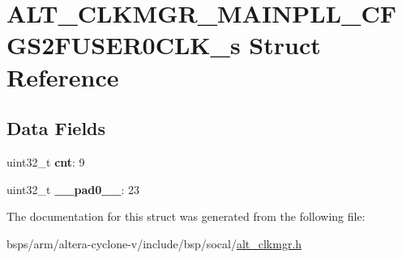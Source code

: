 \hypertarget{structALT__CLKMGR__MAINPLL__CFGS2FUSER0CLK__s}{}\section{A\+L\+T\+\_\+\+C\+L\+K\+M\+G\+R\+\_\+\+M\+A\+I\+N\+P\+L\+L\+\_\+\+C\+F\+G\+S2\+F\+U\+S\+E\+R0\+C\+L\+K\+\_\+s Struct Reference}
\label{structALT__CLKMGR__MAINPLL__CFGS2FUSER0CLK__s}
\subsection*{Data Fields}
\begin{DoxyCompactItemize}
\item 
\mbox{\label{structALT__CLKMGR__MAINPLL__CFGS2FUSER0CLK__s_ab74d8c3880706eefd0e302d9494184bd}} 
uint32\+\_\+t {\bfseries cnt}\+: 9
\item 
\mbox{\label{structALT__CLKMGR__MAINPLL__CFGS2FUSER0CLK__s_ae403d855203f4bf9fe0882b3ed45411f}} 
uint32\+\_\+t {\bfseries \+\_\+\+\_\+pad0\+\_\+\+\_\+}\+: 23
\end{DoxyCompactItemize}


The documentation for this struct was generated from the following file\+:\begin{DoxyCompactItemize}
\item 
bsps/arm/altera-\/cyclone-\/v/include/bsp/socal/\mbox{\hyperlink{alt__clkmgr_8h}{alt\+\_\+clkmgr.\+h}}\end{DoxyCompactItemize}
